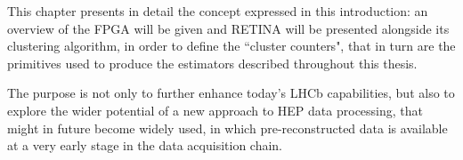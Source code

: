 This chapter presents in detail the concept expressed in this introduction: an overview of the FPGA will be given and RETINA will be presented alongside its clustering algorithm, in order to define the ``cluster counters", that in turn are the primitives used to produce the estimators described throughout this thesis.

The purpose is not only to further enhance today's LHCb capabilities, but also to explore the wider potential of a new approach to HEP data processing, that might in future become widely used, in which pre-reconstructed data is available at a very early stage in the data acquisition chain. 


